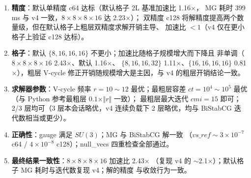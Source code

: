 \documentclass[11pt,a4paper]{article}
\begin{document}
\begin{enumerate}
  \item \textbf{精度}：默认单精度 c64 达标（默认格子 2L 基准加速比 1.16$\times$，
        MG 耗时 399\,ms 与 v4 一致，$8\times8\times8\times16$ 达 2.23$\times$）；
        双精度 c128 将解精度提高两个数量级，但在默认格子上粗层双精度求解开销主导、
        加速比 $<1$（v4 仅在更小格子上验证 c128 达标）。
  \item \textbf{格子}：默认 $\{8,16,16,16\}$ 不更小；加速比随格子规模增大而下降且
        非单调（$8\times8\times8\times16$ 2.43$\times$、默认 1.16$\times$、
        $\{8,16,16,32\}$ 1.11$\times$、$\{16,16,16,16\}$ 0.81$\times$），粗层
        V-cycle 修正开销随规模增大是主因，与 v4 的粗层开销结论一致。
  \item \textbf{求解器参数}：V-cycle 频率 $r=10\sim12$ 最优；最粗层容差
        $ct=10^4\sim10^5$ 最优（与 Python 参考最粗层 $0.1\times\Vert r\Vert$ 一致）；
        最粗层最大迭代 $cmi=15$ 即可；2/3 层均可（3 层本会话略优，v4 连续负载下
        2 层略优，均与 BiStabCG 迭代数相当或更少）。
  \item \textbf{正确性}：gauge 满足 $SU(3)$；MG 与 BiStabCG 解一致
        （$vs\_ref\sim3\times10^{-7}$ c64 / $4\times10^{-8}$ c128）；null\_vecs
        四重检查全部通过。
  \item \textbf{最终结果一致性}：$8\times8\times8\times16$ 加速比 2.43$\times$
        （复现 v4 的 $\sim$2.1$\times$）；默认格子 MG 耗时与迭代数复现 v4；解的精度
        与收敛行为一致。
\end{enumerate}
\end{document}
